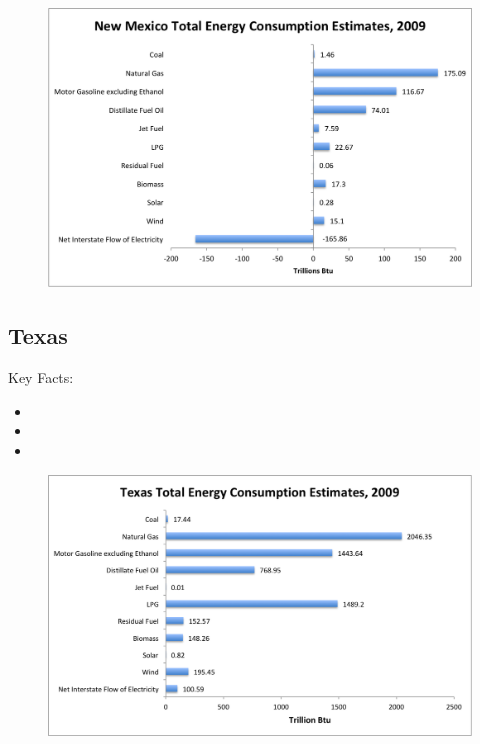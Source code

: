 \documentclass[12pt]{article}
\begin{document}
\begin{figure}[!b]
    \centering
    \includegraphics[width=\linewidth]{NewMexicoQuickGraph}
\end{figure}

\newpage

\subsection{Texas}

\Large Key Facts:

\normalsize

\begin{itemize}

\item

\item

\item

\end{itemize}

\begin{figure}[!b]
    \centering
    \includegraphics[width=\linewidth]{TexasQuickGraph}
\end{figure}
\end{document}
